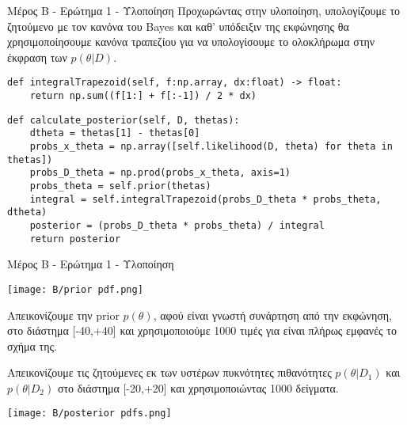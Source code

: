 \documentclass{beamer}
\begin{document}
\begin{frame}[fragile]{Μέρος B - Ερώτημα 1 - Υλοποίηση}
    Προχωρώντας στην υλοποίηση, υπολογίζουμε το ζητούμενο με τον κανόνα του Bayes και καθ' υπόδειξιν της εκφώνησης θα χρησιμοποίησουμε κανόνα τραπεζίου για να υπολογίσουμε το ολοκλήρωμα στην έκφραση των $p(\theta|D)$.
        \lstset{style=python}
\begin{lstlisting}
def integralTrapezoid(self, f:np.array, dx:float) -> float:
    return np.sum((f[1:] + f[:-1]) / 2 * dx)
\end{lstlisting} 

\begin{lstlisting}
def calculate_posterior(self, D, thetas):
    dtheta = thetas[1] - thetas[0]
    probs_x_theta = np.array([self.likelihood(D, theta) for theta in thetas])
    probs_D_theta = np.prod(probs_x_theta, axis=1)
    probs_theta = self.prior(thetas)
    integral = self.integralTrapezoid(probs_D_theta * probs_theta, dtheta)
    posterior = (probs_D_theta * probs_theta) / integral
    return posterior
\end{lstlisting}
\end{frame}
\begin{frame}[fragile]{Μέρος B - Ερώτημα 1 - Υλοποίηση}
\begin{minipage}{0.47\textwidth}
    \texttt{[image: B/prior pdf.png]}
\end{minipage}
\hfill
\begin{minipage}{0.5\textwidth}
Απεικονίζουμε την prior $p(\theta)$, αφού είναι γνωστή συνάρτηση από την εκφώνηση, στο διάστημα [-40,+40] και χρησιμοποιούμε 1000 τιμές για είναι πλήρως εμφανές το σχήμα της.
\end{minipage}
\vspace{0.5cm} %
\begin{minipage}{0.39\textwidth}
Απεικονίζουμε τις ζητούμενες εκ των υστέρων πυκνότητες πιθανότητες $p(\theta|D_1)$ και $p(\theta|D_2)$ στο διάστημα [-20,+20] και χρησιμοποιώντας 1000 δείγματα.
\end{minipage}
\hfill
\begin{minipage}{0.6\textwidth}
    \texttt{[image: B/posterior pdfs.png]}
\end{minipage}
\end{frame}
\end{document}

